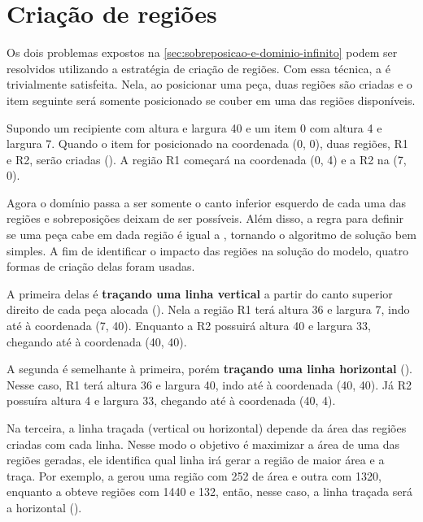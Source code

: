 \section{Criação de regiões}\label{sec:criacao-de-regioes}

Os dois problemas expostos na \cref{sec:sobreposicao-e-dominio-infinito} podem ser
resolvidos utilizando a estratégia de criação de regiões.
Com essa técnica, a  é trivialmente satisfeita.
Nela, ao posicionar uma peça, duas regiões são criadas e o item
seguinte será somente posicionado se couber em uma das regiões disponíveis.

Supondo um recipiente com altura e largura 40 e um item 0 com altura 4 e largura 7.
Quando o item for posicionado na coordenada (0, 0), duas regiões, R1 e R2, serão criadas
().
A região R1 começará na coordenada (0, 4) e a R2 na (7, 0).



Agora o domínio passa a ser somente o canto inferior esquerdo de cada uma das regiões e
sobreposições deixam de ser possíveis.
Além disso, a regra para definir se uma peça cabe em dada região é igual a , tornando
o algoritmo de solução bem simples.
A fim de identificar o impacto das regiões na solução do modelo, quatro formas de criação
delas foram usadas.

A primeira delas é \textbf{traçando uma linha vertical} a partir do canto superior direito de cada
peça alocada ().
Nela a região R1 terá altura 36 e largura 7, indo até à coordenada (7, 40).
Enquanto a R2 possuirá altura 40 e largura 33, chegando até à coordenada (40, 40).

A segunda é semelhante à primeira, porém \textbf{traçando uma linha horizontal}
().
Nesse caso, R1 terá altura 36 e largura 40, indo até à coordenada (40, 40).
Já R2 possuíra altura 4 e largura 33, chegando até à coordenada (40, 4).



Na terceira, a linha traçada (vertical ou horizontal) depende da área das regiões criadas
com cada linha.
Nesse modo o objetivo é maximizar a área de uma das regiões geradas, ele identifica qual linha
irá gerar a região de maior área e a traça.
Por exemplo, a  gerou uma região com 252 de área e outra com 1320,
enquanto a  obteve regiões com 1440 e 132, então, nesse caso, a linha
traçada será a horizontal ().

